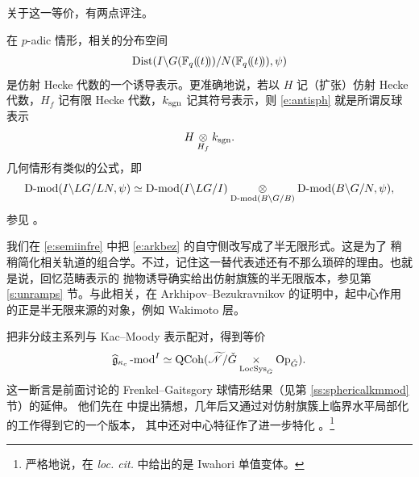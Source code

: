 关于这一等价，有两点评注。

\begin{re} 在 $p$-adic 情形，相关的分布空间
\begin{equation} \label{e:antisph}\operatorname{Dist}( I \backslash
G(\mathbb{F}_q(\!(t)\!)) / N(\mathbb{F}_q(\!(t)\!)), \psi)\end{equation}
是仿射 Hecke 代数的一个诱导表示。更准确地说，若以 $H$ 记（扩张）仿射 Hecke 代数，$H_f$ 记有限 Hecke
代数，$k_{\operatorname{sgn}}$ 记其符号表示，则 \eqref{e:antisph} 就是所谓反球表示
\[ H \underset {H_f} \otimes k_{\operatorname{sgn}}.\]
几何情形有类似的公式，即
\[ \operatorname{D-mod}(I \backslash LG / LN, \psi) \simeq \operatorname{D-mod}(I \backslash LG / I)
\underset {\operatorname{D-mod}(B\backslash G / B)} \otimes \operatorname{D-mod}(B \backslash G/ N, \psi),\]
参见 \cite{ahc}。
\end{re}

\begin{re} 我们在 \eqref{e:semiinfre} 中把 \eqref{e:arkbez} 的自守侧改写成了半无限形式。这是为了
稍稍简化相关轨道的组合学。不过，记住这一替代表述还有不那么琐碎的理由。也就是说，回忆范畴表示的
抛物诱导确实给出仿射旗簇的半无限版本，参见第 \ref{s:unramps} 节。与此相关，在
Arkhipov--Bezukravnikov 的证明中，起中心作用的正是半无限来源的对象，例如 Wakimoto 层。\end{re}

\ssszh \label{ss:iwahorikmmod}把非分歧主系列与 Kac--Moody 表示配对，得到等价
%
\[
 \widehat{\mathfrak{g}}_{\kappa_c}\operatorname{-mod}^I \simeq \operatorname{QCoh}(\widetilde{\mathscr{N}}/\check{G} \underset {\operatorname{LocSys}_{\check{G}}} \times \mathrm{Op}_{\check{G}}).
\]
%
这一断言是前面讨论的 Frenkel--Gaitsgory 球情形结果（见第 \ref{ss:sphericalkmmod} 节）的延伸。
他们先在 \cite{fg06loc} 中提出猜想，几年后又通过对仿射旗簇上临界水平局部化的工作得到它的一个版本，
其中还对中心特征作了进一步特化 \cite{fglocaff}。\footnote{严格地说，在 {\em loc. cit.} 中给出的是
Iwahori 单值变体。}
